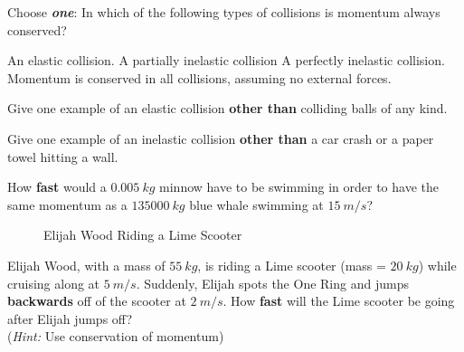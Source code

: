 \begin{questions}
\question[1] Choose \textbf{\emph{one}}: In which of the following types of collisions is momentum always conserved?
\begin{choices}
\choice An elastic collision.
\choice A partially inelastic collision
\choice A perfectly inelastic collision. 
\choice Momentum is conserved in all collisions, assuming no external forces.
\end{choices}

\question[2] Give one example of an elastic collision \textbf{other than} colliding balls of any kind. 

\qspp

\question[2] Give one example of an inelastic collision \textbf{other than} a car crash or a paper towel hitting a wall. 

\qspp

\question[2] How \textbf{fast} would a $\SI{0.005}{kg}$ minnow have to be swimming in order to have the same momentum as a $\SI{135000}{kg}$ blue whale swimming at $\SI{15}{m/s}$? 

\qsppp

\begin{figure}[H]
    \centering
    \caption{Elijah Wood Riding a Lime Scooter}
\end{figure}

\question[3] Elijah Wood, with a mass of $\SI{55}{kg}$, is riding a Lime scooter (mass = $\SI{20}{kg}$) while cruising along at $\SI{5}{m/s}$. Suddenly, Elijah spots the One Ring and jumps \textbf{backwards} off of the scooter at $\SI{2}{m/s}$. How \textbf{fast} will the Lime scooter be going after Elijah jumps off? \\(\emph{Hint:} Use conservation of momentum)


\end{questions}




